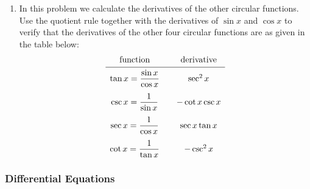 \begin{enumerate}
\begin{enumerate}
\end{enumerate}
\item In this problem we calculate the derivatives of the other
circular functions.  Use the quotient rule together with the
derivatives of $\sin{x}$ and $\cos{x}$ to verify that the derivatives
of the other four circular functions are as given in the table below:
\[
\begin{array}{ccc}
\mbox{function}  & & \mbox{derivative} \\ [2pt] 
\hline \\ [-9pt]
\tan{x} = \dfrac{\sin{x}}{\cos{x}}      
		& &       \sec^2{x} \\ [.15in]
\csc{x} = \dfrac{1}{\sin{x}}     
		 & & -\cot{x}\csc{x}  \\ [.15in]
\sec{x} = \dfrac{1}{\cos{x}}     
		&   &    \sec{x}\tan{x} \\ [.15in]
\cot{x} = \dfrac{1}{\tan{x}}	 
		&    &     -\csc^2{x}
\end{array}
\]

\end{enumerate}
\subsubsection{Differential Equations}
\label{subsubsec:differential-equations}




